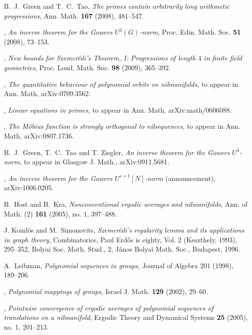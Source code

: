 \documentclass[11pt,reqno]{amsart}
\numberwithin{equation}{section}
\theoremstyle{plain}
\theoremstyle{definition}
\newcommand\1{{\bf 1}}
\newcommand\2{{\bf 2}}
\begin{document}
\begin{thebibliography}{99}
 B.~J.~Green and T.~C.~Tao, \emph{The primes contain arbitrarily long arithmetic progressions}, Ann. Math. \textbf{167} (2008), 481--547.

\bysame, \emph{An inverse theorem for the Gowers $U^3(G)$-norm}, Proc. Edin. Math. Soc. \textbf{51} (2008), 73--153.

\bysame, \emph{New bounds for Szemer\'edi's Theorem, I: Progressions of length $4$ in finite field geometries}, Proc. Lond. Math. Soc. \textbf{98} (2009), 365--392.

 \bysame, \emph{The quantitative behaviour of polynomial orbits on nilmanifolds,} to appear in Ann. Math, arXiv:0709.3562. 

\bysame, \emph{Linear equations in primes,} to appear in Ann. Math, arXiv:math/0606088.

 \bysame, \emph{The M\"obius function is strongly orthogonal to nilsequences,} to appear in Ann. Math, arXiv:0807.1736. 


B.~J.~Green, T.~C.~Tao and T. Ziegler, \emph{An inverse theorem for the Gowers $U^4$-norm}, to appear in Glasgow J. Math., arXiv:0911.5681.

\bysame, \emph{An inverse theorem for the Gowers $U^{s+1}[N]$-norm} (announcement), arXiv:1006.0205.

 B.~Host and B.~Kra, \emph{Nonconventional ergodic averages and nilmanifolds,} Ann. of Math. (2) \textbf{161}
(2005), no. 1, 397--488.

J. Koml\'os and M.~Simonovits, 
\emph{Szemer\'edi's regularity lemma and its applications in graph theory},
Combinatorics, Paul Erd\H{o}s is eighty, Vol. 2 (Keszthely, 1993), 295--352, 
Bolyai Soc. Math. Stud., 2, J\'anos Bolyai Math. Soc., Budapest, 1996.

A.~Leibman, \emph{Polynomial sequences in groups}, Journal of Algebra 201 (1998), 189--206.

 \bysame, \emph{Polynomial mappings of groups,}
Israel J. Math. \textbf{129} (2002), 29--60.

\bysame, \emph{Pointwise convergence of ergodic averages of polynomial sequences of translations on a nilmanifold}, Ergodic Theory and Dynamical Systems \textbf{25} (2005), no. 1, 201--213.


\end{thebibliography}
\end{document}
